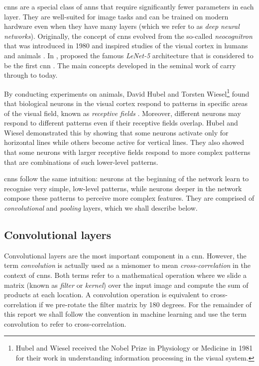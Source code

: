 \documentclass[../report.tex]{subfiles}
\begin{document}
\Glspl{cnn} are a special class of \glspl{ann} that require significantly fewer parameters in each layer.
They are well-suited for image tasks and can be trained on modern hardware even when they have many layers (which we refer to as \emph{deep neural networks}).
Originally, the concept of \glspl{cnn} evolved from the so-called \emph{neocognitron} that was introduced in 1980 and inspired studies of the visual cortex in humans and animals \cite{fukushima1980}.
In \citeyear{lecun1998}, \citeauthor{lecun1998} proposed the famous \emph{LeNet-5} architecture that is considered to be the first \gls{cnn} \cite{lecun1998}. 
The main concepts developed in the seminal work of \citeauthor{lecun1998} carry through to today.

By conducting experiments on animals, David Hubel and Torsten Wiesel\footnote{Hubel and Wiesel received the Nobel Prize in Physiology or Medicine in 1981 for their work in understanding information processing in the visual system.} found that biological neurons in the visual cortex respond to patterns in specific areas of the visual field, known as \emph{receptive fields} \cite{hubel1959}.
Moreover, different neurons may respond to different patterns even if their receptive fields overlap.
Hubel and Wiesel demonstrated this by showing that some neurons activate only for horizontal lines while others become active for vertical lines.
They also showed that some neurons with larger receptive fields respond to more complex patterns that are combinations of such lower-level patterns.

\Glspl{cnn} follow the same intuition: neurons at the beginning of the network learn to recognise very simple, low-level patterns, while neurons deeper in the network compose these patterns to perceive more complex features.
They are comprised of \emph{convolutional} and \emph{pooling} layers, which we shall describe below.

\subsection{Convolutional layers}
\label{sec:convolutional_layers}
Convolutional layers are the most important component in a \gls{cnn}.
However, the term \emph{convolution} is actually used as a misnomer to mean \emph{cross-correlation} in the context of \glspl{cnn}.
Both terms refer to a mathematical operation where we slide a matrix (known as \emph{filter} or \emph{kernel}) over the input image and compute the sum of products at each location.
A convolution operation is equivalent to cross-correlation if we pre-rotate the filter matrix by 180 degrees.
For the remainder of this report we shall follow the convention in machine learning and use the term convolution to refer to cross-correlation.
\end{document}
